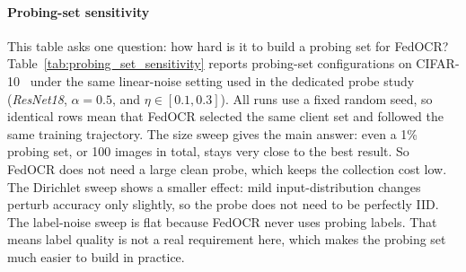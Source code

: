 ﻿\documentclass[conference]{IEEEtran}
\theoremstyle{definition}
\theoremstyle{remark}
\begin{document}
\paragraph{\textbf{Probing-set sensitivity}}
This table asks one question: how hard is it to build a probing set for FedOCR?
Table~\ref{tab:probing_set_sensitivity} reports probing-set configurations on CIFAR-10~\cite{krizhevsky2009learning} under the same linear-noise setting used in the dedicated probe study (\emph{ResNet18}, $\alpha=0.5$, and $\eta\in[0.1,0.3]$).
All runs use a fixed random seed, so identical rows mean that FedOCR selected the same client set and followed the same training trajectory.
The size sweep gives the main answer: even a 1\% probing set, or 100 images in total, stays very close to the best result.
So FedOCR does not need a large clean probe, which keeps the collection cost low.
The Dirichlet sweep shows a smaller effect: mild input-distribution changes perturb accuracy only slightly, so the probe does not need to be perfectly IID.
The label-noise sweep is flat because FedOCR never uses probing labels.
That means label quality is not a real requirement here, which makes the probing set much easier to build in practice.
\end{document}
